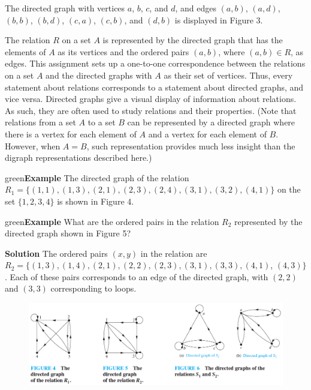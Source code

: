 \documentclass[11pt]{article}
\newenvironment{example}[1][\unskip]{\begin{mybox}{green}{\textbf{Example} {#1}}}{\end{mybox}}
\begin{document}
The directed graph with vertices $a$, $b$, $c$, and $d$, and edges $(a, b)$, $(a, d)$, $(b, b)$, $(b, d)$, $(c, a)$, $(c, b)$, and $(d, b)$ is displayed in Figure 3.

The relation $R$ on a set $A$ is represented by the directed graph that has the elements of $A$ as its vertices and the ordered pairs $(a, b)$, where $(a, b) \in R$, as edges. This assignment sets up a one-to-one correspondence between the relations on a set $A$ and the directed graphs with $A$ as their set of vertices. Thus, every statement about relations corresponds to a statement about directed graphs, and vice versa. Directed graphs give a visual display of information about relations. As such, they are often used to study relations and their properties. (Note that relations from a set $A$ to a set $B$ can be represented by a directed graph where there is a vertex for each element of $A$ and a vertex for each element of $B$. However, when $A = B$, such representation provides much less insight than the digraph representations described here.)
\\

\begin{example}
The directed graph of the relation $R_1 = \{(1, 1), (1, 3), (2, 1), (2, 3), (2, 4), (3, 1), (3, 2), (4, 1)\}$ on the set $\{1, 2, 3, 4\}$ is shown in Figure 4.
\end{example}

\begin{example}
What are the ordered pairs in the relation $R_2$ represented by the directed graph shown in Figure 5?

\textbf{Solution}
The ordered pairs $(x, y)$ in the relation are $R_2 = \{(1, 3), (1, 4), (2, 1), (2, 2), (2, 3), (3, 1), (3, 3), (4, 1)$, $(4, 3)\}$. Each of these pairs corresponds to an edge of the directed graph, with $(2, 2)$ and $(3, 3)$ corresponding to loops.
\end{example}

\begin{figure}[h!]
    \centering
    \includegraphics[width=\textwidth]{img/ch9-figure4_5_6.png}
    \label{fig:my_label}
\end{figure}
\end{document}
